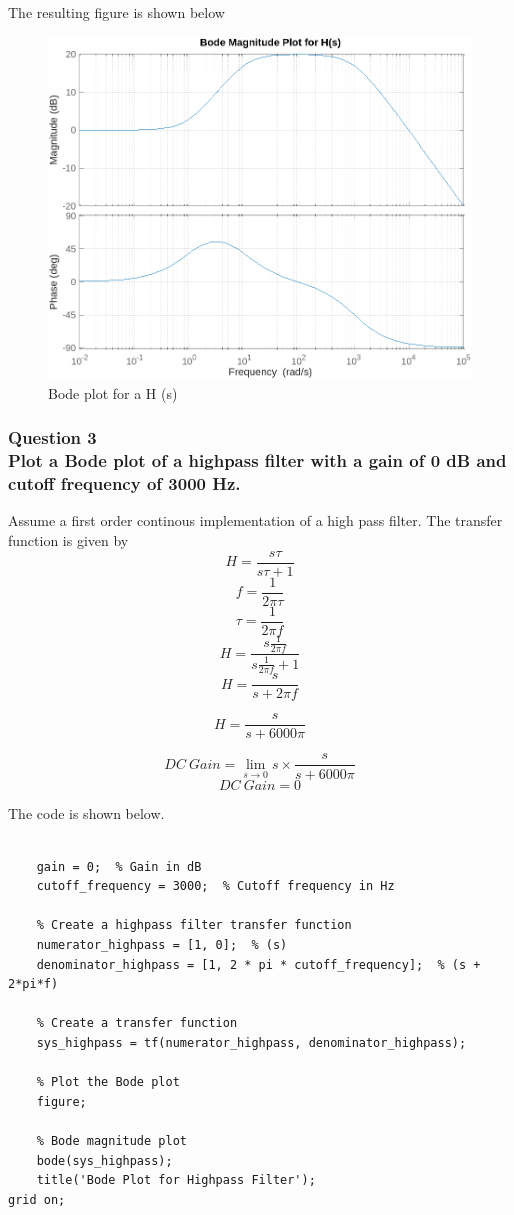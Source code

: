 \documentclass[a4paper,12pt]{article}
\begin{document}
The resulting figure is shown below

\begin{figure}[H]
    \centering
    \includegraphics[width=\linewidth]{q2.png}
    \caption{Bode plot for a H (s)}\label{fig:q2}
\end{figure}






\subsubsection*{Question 3\\Plot a Bode plot of a highpass filter with a gain of 0 dB and cutoff frequency of 3000 Hz.}

Assume a first order continous implementation of a high pass filter. The transfer function is given by 
\[ H = \frac{s\tau}{s\tau +1}\]
\[ f = \frac{1}{2\pi\tau}\]
\[ \tau = \frac{1}{2\pi f} \]
\[ H = \frac{s\frac{1}{2\pi f}}{s\frac{1}{2\pi f} +1}\]
\[ H = \frac{s}{s + 2\pi f}\]

\[ H = \frac{s}{s + 6000\pi}\]

\[DC~Gain = \lim_{s\rightarrow 0} s\times \frac{s}{s + 6000\pi}\]
\[DC~Gain = 0\]

The code is shown below.
\begin{lstlisting}

    gain = 0;  % Gain in dB
    cutoff_frequency = 3000;  % Cutoff frequency in Hz

    % Create a highpass filter transfer function
    numerator_highpass = [1, 0];  % (s)
    denominator_highpass = [1, 2 * pi * cutoff_frequency];  % (s + 2*pi*f)

    % Create a transfer function
    sys_highpass = tf(numerator_highpass, denominator_highpass);

    % Plot the Bode plot
    figure;

    % Bode magnitude plot
    bode(sys_highpass);
    title('Bode Plot for Highpass Filter');
grid on;

\end{lstlisting}
\end{document}
